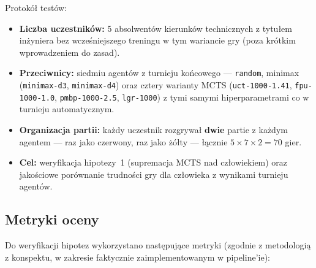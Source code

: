 \documentclass[11pt, a4paper]{article}
\begin{document}
Protokół testów:
\begin{itemize}
    \item \textbf{Liczba uczestników:} 5 absolwentów kierunków technicznych z tytułem inżyniera bez wcześniejszego treningu w tym wariancie gry (poza krótkim wprowadzeniem do zasad). 
    \item \textbf{Przeciwnicy:} siedmiu agentów z turnieju końcowego --- \texttt{random}, minimax (\texttt{minimax-d3}, \texttt{minimax-d4}) oraz cztery warianty MCTS (\texttt{uct-1000-1.41}, \texttt{fpu-1000-1.0}, \texttt{pmbp-1000-2.5}, \texttt{lgr-1000}) z tymi samymi hiperparametrami co w turnieju automatycznym.
    \item \textbf{Organizacja partii:} każdy uczestnik rozgrywał \textbf{dwie} partie z każdym agentem --- raz jako czerwony, raz jako żółty --- łącznie $5 \times 7 \times 2 = 70$ gier.
    \item \textbf{Cel:} weryfikacja hipotezy~1 (supremacja MCTS nad człowiekiem) oraz jakościowe porównanie trudności gry dla człowieka z wynikami turnieju agentów.
\end{itemize}

\subsection{Metryki oceny}
\label{sec:metryki}

Do weryfikacji hipotez wykorzystano następujące metryki (zgodnie z metodologią z konspektu, w zakresie faktycznie zaimplementowanym w pipeline'ie):
\end{document}
